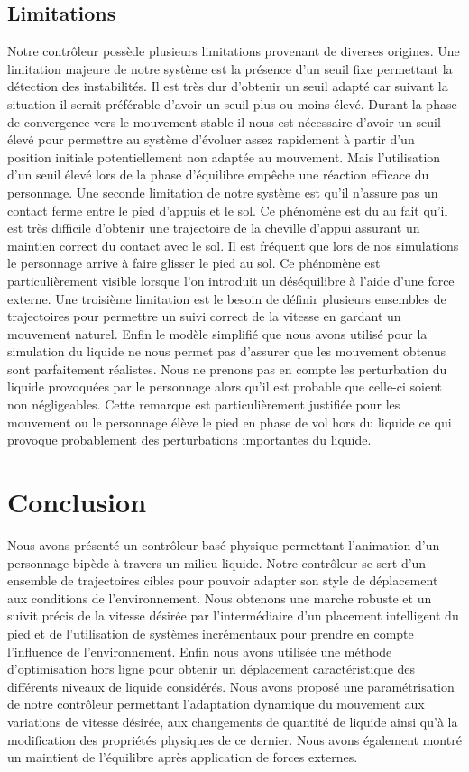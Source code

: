 \documentclass[runningheads,a4paper]{llncs}
\begin{document}
\subsection{Limitations}
Notre contrôleur possède plusieurs limitations provenant de diverses origines. Une limitation majeure de notre système est la présence d'un seuil fixe permettant la détection des instabilités. Il est très dur d'obtenir un seuil adapté car suivant la situation il serait préférable d'avoir un seuil plus ou moins élevé. Durant la phase de convergence vers le mouvement stable il nous est nécessaire d'avoir un seuil élevé pour permettre au système d'évoluer assez rapidement à partir d'un position initiale potentiellement non adaptée au mouvement. Mais l'utilisation d'un seuil élevé lors de la phase d'équilibre empêche  une réaction efficace du personnage. 
Une seconde limitation de notre système est qu'il n'assure pas un contact ferme entre le pied d'appuis et le sol. Ce phénomène est du au fait qu'il est très difficile d'obtenir une trajectoire de la cheville d'appui assurant un maintien correct du contact avec le sol. Il est fréquent que lors de nos simulations le personnage arrive à faire glisser le pied au sol. Ce phénomène est particulièrement visible lorsque l'on introduit un déséquilibre à l'aide d'une force externe. 
Une troisième limitation est le besoin de définir plusieurs ensembles de trajectoires pour permettre un suivi correct de la vitesse en gardant un mouvement naturel. 
Enfin le modèle simplifié que nous avons utilisé pour la simulation du liquide ne nous permet pas d'assurer que les mouvement obtenus sont parfaitement réalistes. Nous ne prenons pas en compte les perturbation du liquide provoquées par le personnage alors qu'il est probable que celle-ci soient non négligeables. Cette remarque est particulièrement justifiée pour les mouvement ou le personnage élève le pied en phase de vol hors du liquide ce qui provoque probablement des perturbations importantes du liquide.

\section{Conclusion}
\label{sec:conclusion}
%
Nous avons présenté un contrôleur basé physique permettant l'animation d'un personnage bipède à travers un milieu liquide. Notre contrôleur se sert d'un ensemble de trajectoires cibles pour pouvoir adapter son style de déplacement aux conditions de l'environnement. Nous obtenons une marche robuste et un suivit précis de la vitesse désirée par l'intermédiaire d'un placement intelligent du pied et de l'utilisation de systèmes incrémentaux pour prendre en compte l'influence de l'environnement. Enfin nous avons utilisée une méthode d'optimisation hors ligne pour obtenir un déplacement caractéristique des différents niveaux de liquide considérés.
Nous avons proposé une paramétrisation de notre contrôleur permettant l'adaptation dynamique du mouvement aux variations de vitesse désirée, aux changements de quantité de liquide ainsi qu'à la modification des propriétés physiques de ce dernier. Nous avons également montré un maintient de l'équilibre après application de forces externes.
\end{document}
